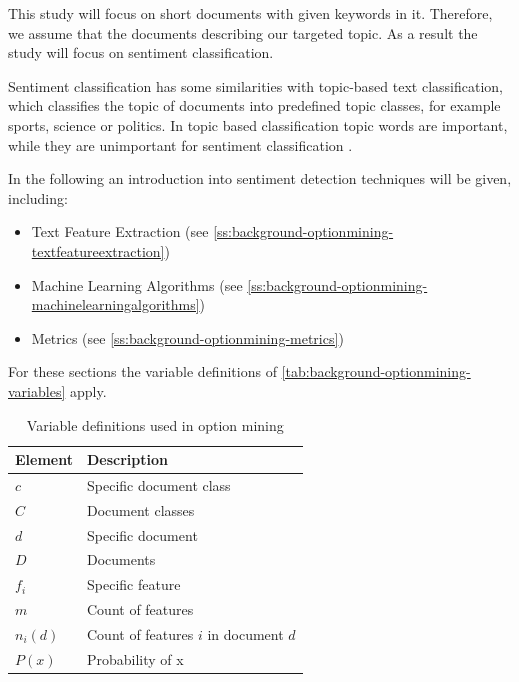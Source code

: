 This study will focus on short documents with given keywords in it. 
Therefore, we assume that the documents describing our targeted topic.
As a result the study will focus on sentiment classification.

Sentiment classification has some similarities with topic-based text classification, which classifies the topic of documents into predefined topic classes, for example sports, science or politics.
In topic based classification topic words are important, while they are unimportant for sentiment classification \cite[page 412f]{Liu2007}.

In the following an introduction into sentiment detection techniques will be given, including:

\begin{itemize}
    \item Text Feature Extraction (see \cref{ss:background-optionmining-textfeatureextraction})
    \item Machine Learning Algorithms (see \cref{ss:background-optionmining-machinelearningalgorithms})
    \item Metrics (see \cref{ss:background-optionmining-metrics})
\end{itemize}

For these sections the variable definitions of \autoref{tab:background-optionmining-variables} apply.

\begin{table}
	\begin{center}
		\begin{tabular}{l l}
			\hline
			\textbf{Element} & \textbf{Description} \\ \hline
			$c$ & Specific document class \\
			$C$ & Document classes \\
			$d$ & Specific document \\
			$D$ & Documents \\
			$f_i$ & Specific feature \\
			$m$ & Count of features \\
			$n_i(d)$ & Count of features $i$ in document $d$ \\
			$P(x)$ & Probability of x \\ \hline
		\end{tabular}

        \caption{Variable definitions used in option mining}
        \label{tab:background-optionmining-variables}
	\end{center}
\end{table}

